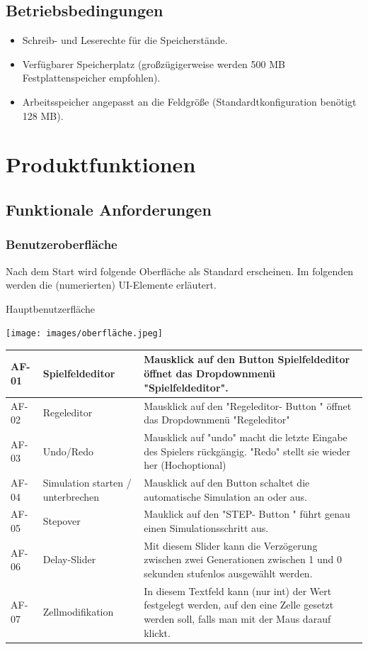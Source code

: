 \documentclass[11pt,a4paper]{article}
\begin{document}
\subsection{Betriebsbedingungen}


\begin{itemize}
    \item Schreib- und Leserechte für die Speicherstände.
    \item Verfügbarer Speicherplatz (großzügigerweise werden 500 MB Festplattenspeicher empfohlen).
    \item Arbeitsspeicher angepasst an die Feldgröße (Standardtkonfiguration benötigt 128 MB).
\end{itemize}

\pagebreak



\section{Produktfunktionen}
\subsection{Funktionale Anforderungen}
\subsubsection{Benutzeroberfläche}
Nach dem Start wird folgende Oberfläche als Standard erscheinen. Im folgenden werden die (numerierten) UI-Elemente erläutert.
\par
Hauptbenutzerfläche
\par
\texttt{[image: images/oberfläche.jpeg]}

\begin{longtable}[m]{|m{2cm}|m{4cm}|m{9cm}|}
\hline
 AF-01 & Spielfeldeditor & Mausklick auf den Button Spielfeldeditor öffnet das Dropdownmenü "Spielfeldeditor".   \\
 \hline
AF-02 & Regeleditor & Mausklick auf den "Regeleditor- Button " öffnet das Dropdownmenü "Regeleditor" \\
 \hline
AF-03& Undo/Redo& Mausklick auf "undo" macht die letzte Eingabe des Spielers rückgängig. "Redo" stellt sie wieder her (Hochoptional) \\
 \hline
 AF-04 & Simulation starten / unterbrechen & Mausklick auf den Button schaltet die automatische Simulation an oder aus. \\
 \hline
 AF-05& Stepover & Mauklick auf den "STEP- Button " führt genau einen Simulationsschritt aus.  \\

\hline
 AF-06 & Delay-Slider & Mit diesem Slider kann die Verzögerung zwischen zwei Generationen zwischen 1 und 0 sekunden stufenlos ausgewählt werden. \\
 \hline
 AF-07 & Zellmodifikation & In diesem Textfeld kann (nur int) der Wert festgelegt werden, auf den eine Zelle gesetzt werden soll, falls man mit der Maus darauf klickt.  \\
\hline
\end{longtable}
\end{document}
